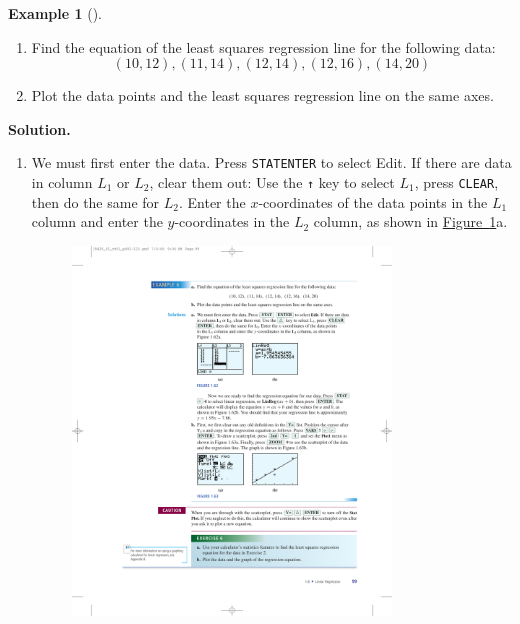 \documentclass[10pt,]{book}
\theoremstyle{plain}
\theoremstyle{definition}
\theoremstyle{definition}
\newtheorem{example}[theorem]{Example}
\theoremstyle{definition}
\theoremstyle{definition}
\numberwithin{equation}{section}
\begin{document}
\begin{example}[]\label{example-GC-regression}
\leavevmode%
\begin{enumerate}[label=*\alph**]
\item\hypertarget{li-216}{}Find the equation of the least squares regression line for the following data:
            \begin{equation*}(10, 12), (11, 14), (12, 14), (12, 16), (14, 20)\end{equation*}\item\hypertarget{li-217}{}Plot the data points and the least squares regression line on the same axes.\end{enumerate}
\par\medskip\noindent%
\textbf{Solution.}\quad \leavevmode%
\begin{enumerate}[label=*\alph**]
\item\hypertarget{li-218}{}We must first enter the data. Press \lstinline?STAT?\lstinline?ENTER? to select Edit. If there are data in column \(L_1\) or \(L_2\), clear them out: Use the \lstinline?↑? key to select \(L_1\), press \lstinline?CLEAR?, then do the same for \(L_2\). Enter the \(x\)-coordinates of the data points in the \(L_1\) column and enter the \(y\)-coordinates in the \(L_2\) column, as shown in \hyperref[fig-GC-regression]{Figure~\ref{fig-GC-regression}}a.
        \leavevmode%
\begin{figure}
\centering
\includegraphics[width=0.80\textwidth,]{images/fig-GC-regression.pdf}\caption{\label{fig-GC-regression}}
\end{figure}


\end{enumerate}
\end{example}
\end{document}
